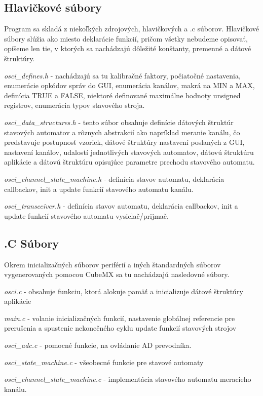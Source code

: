\documentclass[main.tex]{subfiles}
\begin{document}
\begin{multicols*}{2}
			\subsection{Hlavičkové súbory}
			Program sa skladá z niekoľkých zdrojových, hlavičkových a  .c súborov. Hlavičkové súbory slúžia ako miesto deklarácie funkcií, pričom všetky nebudeme opisovať, opíšeme len tie, v ktorých sa nachádzajú dôležité konštanty, premenné a dátové štruktúry.
			
			\textit{osci\_defines.h } - nachádzajú sa tu kalibračné faktory, počiatočné nastavenia, enumerácie opkódov správ do GUI, enumerácia kanálov, makrá na MIN a MAX, definícia TRUE a FALSE, niektoré definované maximálne hodnoty unsigned registrov, enumerácia typov stavového stroja.
			
			\textit{osci\_data\_structures.h} - tento súbor obsahuje definície dátových štruktúr stavových automatov a rôznych abstrakcií ako napríklad meranie kanálu, čo predstavuje postupnosť vzoriek, dátové štruktúry nastavení poslaných z GUI, nastavení kanálov, udalostí jednotlivých stavových automatov, dátovú štruktúru aplikácie a dátovú štruktúru opisujúce parametre prechodu stavového automatu.
			
			\textit{osci\_channel\_state\_machine.h} - definícia stavov automatu, deklarácia callbackov, init a update funkcií stavového automatu kanálu.
			
			\textit{osci\_transceiver.h} - definícia stavov automatu, deklarácia callbackov, init a update funkcií stavového automatu vysielač/prijmač.
			
			\subsection{.C Súbory}
			Okrem inicializačných súborov periférií a iných štandardných súborov vygenerovaných pomocou CubeMX sa tu nachádzajú nasledovné súbory.
			
			\textit{ osci.c} - obsahuje funkciu, ktorá alokuje pamäť a inicializuje dátové štruktúry aplikácie
			
			\textit{ main.c} - volanie inicializačných funkcií, nastavenie globálnej referencie pre prerušenia a spustenie nekonečného cyklu update funkcií stavových strojov
			
			\textit{ osci\_adc.c} - pomocné funkcie, na ovládanie AD prevodníka. 
			
			
			\textit{ osci\_state\_machine.c} - všeobecné funkcie pre stavové automaty
			
			\textit{ osci\_channel\_state\_machine.c} - implementácia stavového automatu meracieho kanálu. 
			

\end{multicols*}
\end{document}
